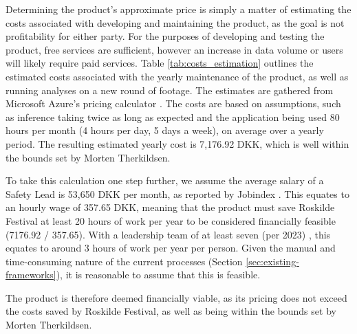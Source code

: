 Determining the product's approximate price is simply a matter of estimating the costs associated with developing and maintaining the product, as the goal is not profitability for either party. For the purposes of developing and testing the product, free services are sufficient, however an increase in data volume or users will likely require paid services. Table \ref{tab:costs_estimation} outlines the estimated costs associated with the yearly maintenance of the product, as well as running analyses on a new round of footage. The estimates are gathered from Microsoft Azure's pricing calculator \cite{azure_pricing}. The costs are based on assumptions, such as inference taking twice as long as expected and the application being used 80 hours per month (4 hours per day, 5 days a week), on average over a yearly period. The resulting estimated yearly cost is 7,176.92 DKK, which is well within the bounds set by Morten Therkildsen.



To take this calculation one step further, we assume the average salary of a Safety Lead is 53,650 DKK per month, as reported by Jobindex \cite{jobindex}. This equates to an hourly wage of 357.65 DKK, meaning that the product must save Roskilde Festival at least 20 hours of work per year to be considered financially feasible (7176.92 / 357.65). With a leadership team of at least seven (per 2023) \cite{rf_team}, this equates to around 3 hours of work per year per person. Given the manual and time-consuming nature of the current processes (Section \ref{sec:existing-frameworks}), it is reasonable to assume that this is feasible.

The product is therefore deemed financially viable, as its pricing does not exceed the costs saved by Roskilde Festival, as well as being within the bounds set by Morten Therkildsen.
